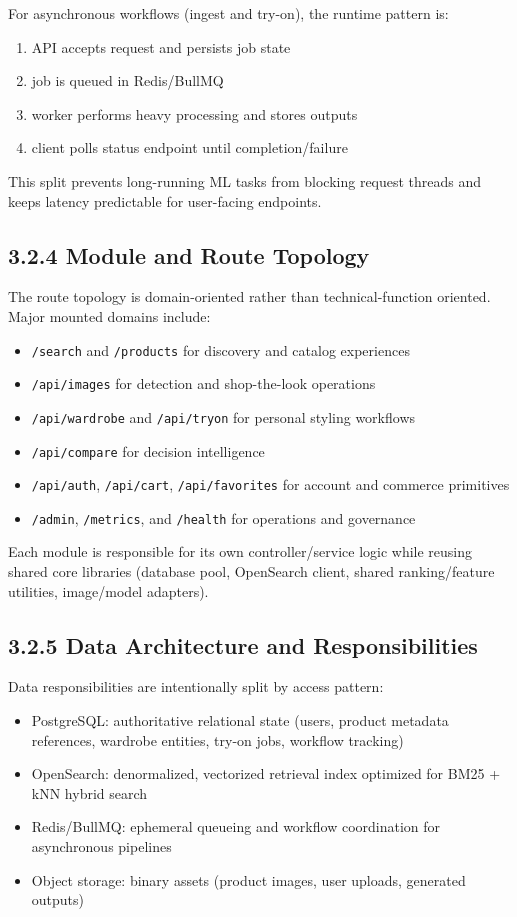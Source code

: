 \documentclass[12pt,a4paper]{report}
\begin{document}
For asynchronous workflows (ingest and try-on), the runtime pattern is:
\begin{enumerate}
\item API accepts request and persists job state
\item job is queued in Redis/BullMQ
\item worker performs heavy processing and stores outputs
\item client polls status endpoint until completion/failure
\end{enumerate}

This split prevents long-running ML tasks from blocking request threads and keeps latency predictable for user-facing endpoints.

\subsection{3.2.4 Module and Route Topology}
The route topology is domain-oriented rather than technical-function oriented. Major mounted domains include:
\begin{itemize}
\item \texttt{/search} and \texttt{/products} for discovery and catalog experiences
\item \texttt{/api/images} for detection and shop-the-look operations
\item \texttt{/api/wardrobe} and \texttt{/api/tryon} for personal styling workflows
\item \texttt{/api/compare} for decision intelligence
\item \texttt{/api/auth}, \texttt{/api/cart}, \texttt{/api/favorites} for account and commerce primitives
\item \texttt{/admin}, \texttt{/metrics}, and \texttt{/health} for operations and governance
\end{itemize}

Each module is responsible for its own controller/service logic while reusing shared core libraries (database pool, OpenSearch client, shared ranking/feature utilities, image/model adapters).

\subsection{3.2.5 Data Architecture and Responsibilities}
Data responsibilities are intentionally split by access pattern:
\begin{itemize}
\item PostgreSQL: authoritative relational state (users, product metadata references, wardrobe entities, try-on jobs, workflow tracking)
\item OpenSearch: denormalized, vectorized retrieval index optimized for BM25 + kNN hybrid search
\item Redis/BullMQ: ephemeral queueing and workflow coordination for asynchronous pipelines
\item Object storage: binary assets (product images, user uploads, generated outputs)
\end{itemize}
\end{document}
